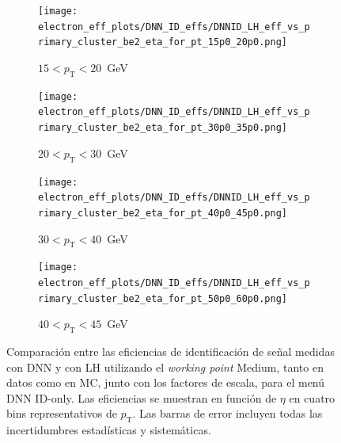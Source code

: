 \begin{figure}[h]
  \centering

  \begin{subfigure}[b]{0.48\textwidth}
    \centering
    \texttt{[image: electron\_eff\_plots/DNN\_ID\_effs/DNNID\_LH\_eff\_vs\_primary\_cluster\_be2\_eta\_for\_pt\_15p0\_20p0.png]}
    \caption{$15 < p_{\mathrm{T}} < 20$~GeV}
    \label{fig:eff_dnn_lh_ptbin1}
  \end{subfigure}
  \hfill
  \begin{subfigure}[b]{0.48\textwidth}
    \centering
    \texttt{[image: electron\_eff\_plots/DNN\_ID\_effs/DNNID\_LH\_eff\_vs\_primary\_cluster\_be2\_eta\_for\_pt\_30p0\_35p0.png]}
    \caption{$20 < p_{\mathrm{T}} < 30$~GeV}
    \label{fig:eff_dnn_lh_ptbin2}
  \end{subfigure}

  \vspace{0.5cm}

  \begin{subfigure}[b]{0.48\textwidth}
    \centering
    \texttt{[image: electron\_eff\_plots/DNN\_ID\_effs/DNNID\_LH\_eff\_vs\_primary\_cluster\_be2\_eta\_for\_pt\_40p0\_45p0.png]}
    \caption{$30 < p_{\mathrm{T}} < 40$~GeV}
    \label{fig:eff_dnn_lh_ptbin3}
  \end{subfigure}
  \hfill
  \begin{subfigure}[b]{0.48\textwidth}
    \centering
    \texttt{[image: electron\_eff\_plots/DNN\_ID\_effs/DNNID\_LH\_eff\_vs\_primary\_cluster\_be2\_eta\_for\_pt\_50p0\_60p0.png]}
    \caption{$40 < p_{\mathrm{T}} < 45$~GeV}
    \label{fig:eff_dnn_lh_ptbin4}
  \end{subfigure}

  \caption{
    Comparación entre las eficiencias de identificación de señal medidas con DNN y con LH utilizando el \textit{working point} Medium, 
    tanto en datos como en MC, junto con los factores de escala, para el menú DNN ID-only. 
    Las eficiencias se muestran en función de $\eta$ en cuatro bins representativos de $p_{\mathrm{T}}$. 
    Las barras de error incluyen todas las incertidumbres estadísticas y sistemáticas.}
  \label{fig:eff_sfs_dnn_vs_lh_eta_4ptbins}
\end{figure}


